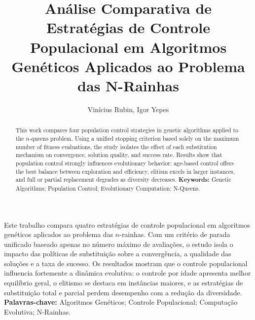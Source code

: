 \documentclass[12pt]{article}
\title{Análise Comparativa de Estratégias de Controle Populacional em Algoritmos Genéticos Aplicados ao Problema das N-Rainhas}
\author{Vinícius Rubin\inst{1}, Igor Yepes\inst{1}}
\begin{document}
\maketitle

\begin{abstract}
This work compares four population control strategies in genetic algorithms applied to the $n$-queens problem. Using a unified stopping criterion based solely on the maximum number of fitness evaluations, the study isolates the effect of each substitution mechanism on convergence, solution quality, and success rate. Results show that population control strongly influences evolutionary behavior: age-based control offers the best balance between exploration and efficiency, elitism excels in larger instances, and full or partial replacement degrades as diversity decreases.
\textbf{Keywords:} Genetic Algorithms; Population Control; Evolutionary Computation; N-Queens.
\end{abstract}

\begin{resumo}
Este trabalho compara quatro estratégias de controle populacional em algoritmos genéticos aplicados ao problema das $n$-rainhas. Com um critério de parada unificado baseado apenas no número máximo de avaliações, o estudo isola o impacto das políticas de substituição sobre a convergência, a qualidade das soluções e a taxa de sucesso. Os resultados mostram que o controle populacional influencia fortemente a dinâmica evolutiva: o controle por idade apresenta melhor equilíbrio geral, o elitismo se destaca em instâncias maiores, e as estratégias de substituição total e parcial perdem desempenho com a redução da diversidade.
\textbf{Palavras-chave:} Algoritmos Genéticos; Controle Populacional; Computação Evolutiva; N-Rainhas.
\end{resumo}










\end{document}
